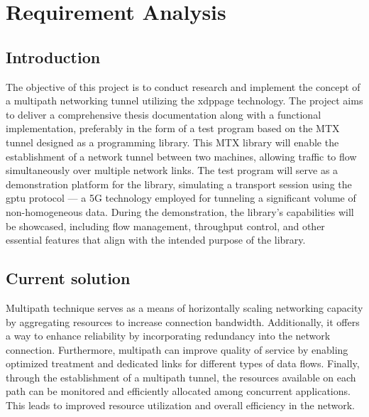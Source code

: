 \chapter{Requirement Analysis}\label{sec:reqs}\minitoc\vspace{.5cm}

\section{Introduction}
The objective of this project is to conduct research and implement the concept of a multipath networking tunnel utilizing the \ac{xdppage} technology. The project aims to deliver a comprehensive thesis documentation along with a functional implementation, preferably in the form of a test program based on the \ac{MTX} tunnel designed as a programming library.
This \ac{MTX} library will enable the establishment of a network tunnel between two machines, allowing traffic to flow simultaneously over multiple network links. 
The test program will serve as a demonstration platform for the library, simulating a transport session using the \ac{gptu} protocol — a 5G technology employed for tunneling a significant volume of non-homogeneous data.
During the demonstration, the library's capabilities will be showcased, including flow management, throughput control, and other essential features that align with the intended purpose of the library.

\section{Current solution}\label{sec:reqs:current_solutions}
Multipath technique serves as a means of horizontally scaling networking capacity by aggregating resources to increase connection bandwidth. 
Additionally, it offers a way to enhance reliability by incorporating redundancy into the network connection. Furthermore, multipath can improve quality of service by enabling optimized treatment and dedicated links for different types of data flows.
Finally, through the establishment of a multipath tunnel, the resources available on each path can be monitored and efficiently allocated among concurrent applications. 
This leads to improved resource utilization and overall efficiency in the network.

